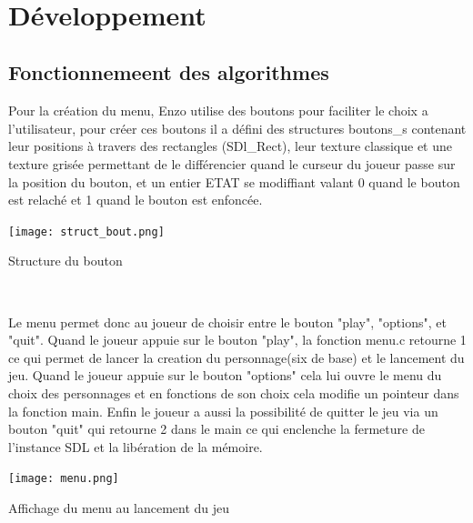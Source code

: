 \documentclass[10pt]{article}
\begin{document}
\begin{center}
\begin{center}
\label{fig4}\\
\end{center}

\clearpage
\section{Développement}
   \subsection{Fonctionnemeent des algorithmes}
       Pour la création du menu, Enzo utilise des boutons pour faciliter le choix a l'utilisateur, pour créer ces boutons il a défini des structures boutons\_s contenant leur positions à travers des rectangles (SDl\_Rect), leur texture classique et une texture grisée permettant de le différencier quand le curseur du joueur passe sur la position du bouton, et un entier ETAT se modiffiant valant 0 quand le bouton est relaché et 1 quand le bouton est enfoncée.
\\
    \begin{center}
        \centering
        \texttt{[image: struct\_bout.png]}
        \caption{Structure du bouton}
        \label{fig4}\\
    \end{center}   
    Le menu permet donc au joueur de choisir entre le bouton "play", "options", et "quit". Quand le joueur appuie sur le bouton "play", la fonction menu.c retourne 1 ce qui permet de lancer la creation du personnage(six de base) et le lancement du jeu. Quand le joueur appuie sur le bouton "options" cela lui ouvre le menu du choix des personnages et en fonctions de son choix cela modifie un pointeur dans la fonction main. Enfin le joueur a aussi la possibilité de quitter le jeu via un bouton "quit" qui retourne 2 dans le main ce qui enclenche la fermeture de l'instance SDL et la libération de la mémoire. 
\\
    \begin{center}
        \centering
        \texttt{[image: menu.png]}
        \caption{Affichage du menu au lancement du jeu}
        \label{fig4}\\
    \end{center}      



    \\


\end{center}
\end{document}
